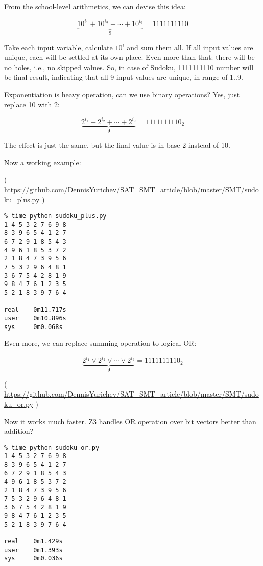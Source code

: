 From the school-level arithmetics, we can devise this idea:

\begin{equation}
\underbrace{10^{i_1} + 10^{i_2} + \cdots + 10^{i_9}}_9 = 1111111110
\end{equation}

Take each input variable, calculate $10^i$ and sum them all.
If all input values are unique, each will be settled at its own place.
Even more than that: there will be no holes, i.e., no skipped values.
So, in case of Sudoku, 1111111110 number will be final result, indicating that all 9 input values are unique, in range of 1..9.

Exponentiation is heavy operation, can we use binary operations? Yes, just replace 10 with 2:

\begin{equation}
\underbrace{2^{i_1} + 2^{i_2} + \cdots + 2^{i_9}}_9 = 1111111110_2
\end{equation}

The effect is just the same, but the final value is in base 2 instead of 10.

Now a working example:


( \url{https://github.com/DennisYurichev/SAT_SMT_article/blob/master/SMT/sudoku_plus.py} )

\begin{lstlisting}
% time python sudoku_plus.py
1 4 5 3 2 7 6 9 8
8 3 9 6 5 4 1 2 7
6 7 2 9 1 8 5 4 3
4 9 6 1 8 5 3 7 2
2 1 8 4 7 3 9 5 6
7 5 3 2 9 6 4 8 1
3 6 7 5 4 2 8 1 9
9 8 4 7 6 1 2 3 5
5 2 1 8 3 9 7 6 4

real    0m11.717s
user    0m10.896s
sys     0m0.068s
\end{lstlisting}

Even more, we can replace summing operation to logical OR:

\begin{equation}
\underbrace{2^{i_1} \vee 2^{i_2} \vee \cdots \vee 2^{i_9}}_9 = 1111111110_2
\end{equation}


( \url{https://github.com/DennisYurichev/SAT_SMT_article/blob/master/SMT/sudoku_or.py} )

Now it works much faster. Z3 handles OR operation over bit vectors better than addition?

\begin{lstlisting}
% time python sudoku_or.py
1 4 5 3 2 7 6 9 8
8 3 9 6 5 4 1 2 7
6 7 2 9 1 8 5 4 3
4 9 6 1 8 5 3 7 2
2 1 8 4 7 3 9 5 6
7 5 3 2 9 6 4 8 1
3 6 7 5 4 2 8 1 9
9 8 4 7 6 1 2 3 5
5 2 1 8 3 9 7 6 4

real    0m1.429s
user    0m1.393s
sys     0m0.036s
\end{lstlisting}

